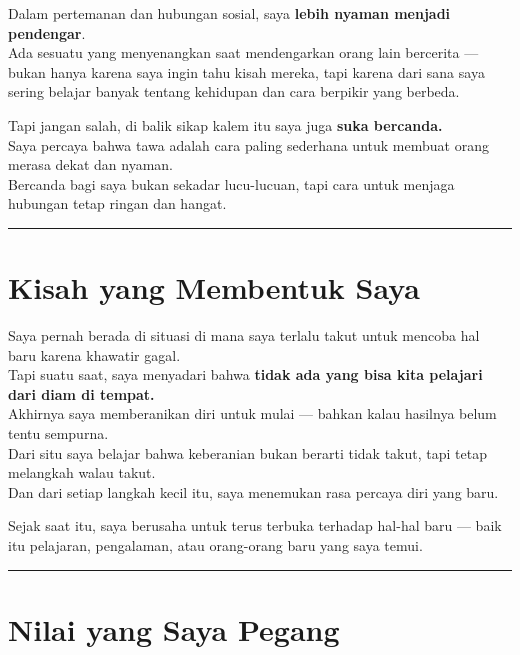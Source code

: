 \documentclass[
  letterpaper,
  DIV=11,
  numbers=noendperiod]{scrreprt}
\begin{document}
Dalam pertemanan dan hubungan sosial, saya \textbf{lebih nyaman menjadi
pendengar}.\\
Ada sesuatu yang menyenangkan saat mendengarkan orang lain bercerita ---
bukan hanya karena saya ingin tahu kisah mereka, tapi karena dari sana
saya sering belajar banyak tentang kehidupan dan cara berpikir yang
berbeda.

Tapi jangan salah, di balik sikap kalem itu saya juga \textbf{suka
bercanda.}\\
Saya percaya bahwa tawa adalah cara paling sederhana untuk membuat orang
merasa dekat dan nyaman.\\
Bercanda bagi saya bukan sekadar lucu-lucuan, tapi cara untuk menjaga
hubungan tetap ringan dan hangat.

\begin{center}\rule{0.5\linewidth}{0.5pt}\end{center}

\section{\texorpdfstring{\textbf{Kisah yang Membentuk
Saya}}{Kisah yang Membentuk Saya}}\label{kisah-yang-membentuk-saya}

Saya pernah berada di situasi di mana saya terlalu takut untuk mencoba
hal baru karena khawatir gagal.\\
Tapi suatu saat, saya menyadari bahwa \textbf{tidak ada yang bisa kita
pelajari dari diam di tempat.}\\
Akhirnya saya memberanikan diri untuk mulai --- bahkan kalau hasilnya
belum tentu sempurna.\\
Dari situ saya belajar bahwa keberanian bukan berarti tidak takut, tapi
tetap melangkah walau takut.\\
Dan dari setiap langkah kecil itu, saya menemukan rasa percaya diri yang
baru.

Sejak saat itu, saya berusaha untuk terus terbuka terhadap hal-hal baru
--- baik itu pelajaran, pengalaman, atau orang-orang baru yang saya
temui.

\begin{center}\rule{0.5\linewidth}{0.5pt}\end{center}

\section{\texorpdfstring{\textbf{Nilai yang Saya
Pegang}}{Nilai yang Saya Pegang}}\label{nilai-yang-saya-pegang}
\end{document}
